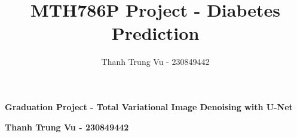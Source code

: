 \documentclass[12pt]{article}
\title{MTH786P Project - Diabetes Prediction}
\author{Thanh Trung Vu - 230849442}
\makeatletter
\renewcommand{\maketitle}{
    {\LARGE \@title \par}      %
    {\large \@author \par}     %
}
\makeatother
\begin{document}
\setlength\parskip{0.5em plus 0.1em minus 0.2em}




\begin{center}
{\large \textbf{Graduation Project - Total Variational Image Denoising with U-Net}}

{\large \textbf{Thanh Trung Vu - 230849442}}
\end{center}

\end{document}

